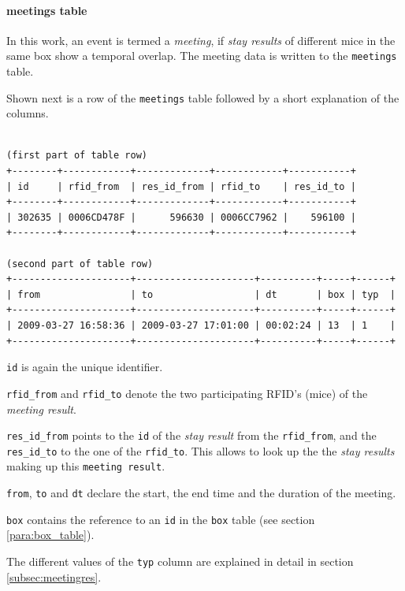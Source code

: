 \paragraph{meetings table}
\label{para:meetings_table}

In this work, an event is termed a \textit{meeting}, if \textit{stay results} of different mice in the same box show a temporal overlap. The meeting data is written to the \lstinline|meetings| table.

Shown next is a row of the \lstinline|meetings| table followed by a short explanation of the columns.

\codescript
{}
\begin{lstlisting}[frame=none]

(first part of table row)
+--------+------------+-------------+------------+-----------+
| id     | rfid_from  | res_id_from | rfid_to    | res_id_to |
+--------+------------+-------------+------------+-----------+
| 302635 | 0006CD478F |      596630 | 0006CC7962 |    596100 | 
+--------+------------+-------------+------------+-----------+

(second part of table row)
+---------------------+---------------------+----------+-----+------+
| from                | to                  | dt       | box | typ  |
+---------------------+---------------------+----------+-----+------+
| 2009-03-27 16:58:36 | 2009-03-27 17:01:00 | 00:02:24 | 13  | 1    |
+---------------------+---------------------+----------+-----+------+
\end{lstlisting}

\begin{mydesc}
	\item \lstinline|id| is again the unique identifier.
	\item \lstinline|rfid_from| and \lstinline|rfid_to| denote the two participating RFID's (mice) of the \textit{meeting result}.
	\item \lstinline|res_id_from| points to the \lstinline|id| of the \textit{stay result} from the \lstinline|rfid_from|, and the \lstinline|res_id_to| to the one of the \lstinline|rfid_to|. This allows to look up the the \textit{stay results} making up this \lstinline|meeting result|.
	\item \lstinline|from|, \lstinline|to| and \lstinline|dt| declare the start, the end time and the duration of the meeting.
	\item \lstinline|box| contains the reference to an \lstinline|id| in the \lstinline|box| table (see section \ref{para:box_table}).
	\item The different values of the \lstinline|typ| column are explained in detail in section \ref{subsec:meetingres}.
\end{mydesc}

